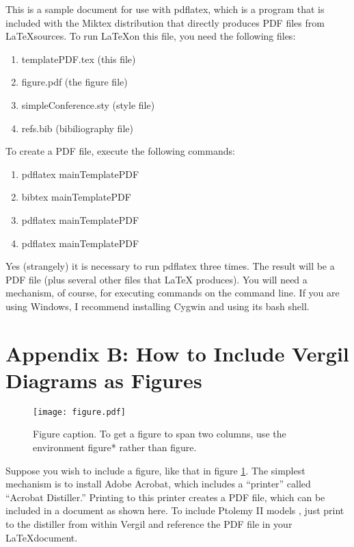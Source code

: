 \documentclass[10pt,twocolumn]{article}
\begin{document}
This is a sample document for use with pdflatex, which is
a program that is included with the Miktex distribution
that directly produces PDF files from \LaTeX sources.
To run \LaTeX on this file, you need the following files:
\begin{enumerate}
\item templatePDF.tex (this file)
\item figure.pdf (the figure file)
\item simpleConference.sty (style file)
\item refs.bib (bibiliography file)
\end{enumerate}
\noindent
To create a PDF file, execute the following commands:
\begin{enumerate}
\item pdflatex mainTemplatePDF
\item bibtex mainTemplatePDF
\item pdflatex mainTemplatePDF
\item pdflatex mainTemplatePDF
\end{enumerate}
\noindent
Yes (strangely) it is necessary to run pdflatex three times.
The result will be a PDF file (plus several other files that \LaTeX
produces).  You will need a mechanism, of course, for executing
commands on the command line. If you are using Windows, I recommend
installing Cygwin and using its bash shell.

\section{Appendix B: How to Include Vergil Diagrams as Figures}

\begin{figure}[!b]
  \begin{center}
    \texttt{[image: figure.pdf]}
  \end{center}

  \caption{\small Figure caption. To get a figure to span two
      columns, use the environment figure* rather than figure.}
  \label{fig-label}
\end{figure}


Suppose you wish to include a figure, like that in figure \ref{fig-label}.
The simplest mechanism is to install Adobe Acrobat, which includes
a ``printer'' called ``Acrobat Distiller.'' Printing to this printer
creates a PDF file, which can be included in a document as shown
here.  To include Ptolemy II models \cite{PtolemyVol1:04},
just print to the distiller from within Vergil and reference
the PDF file in your \LaTeX document.
\end{document}
